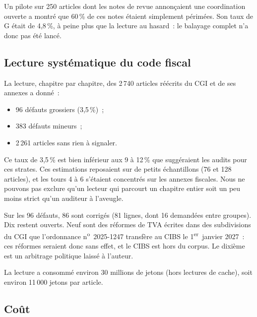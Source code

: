 \documentclass[11pt,a4paper]{article}
\begin{document}
Un pilote sur 250 articles dont les notes de revue annonçaient une coordination ouverte a montré que 60\,\% de ces notes étaient simplement périmées. Son taux de G était de 4,8\,\%, à peine plus que la lecture au hasard~: le balayage complet n'a donc pas été lancé.

\subsection{Lecture systématique du code fiscal}

La lecture, chapitre par chapitre, des 2\,740 articles réécrits du CGI et de ses annexes a donné~:
\begin{itemize}
  \item 96 défauts grossiers (3,5\,\%)~;
  \item 383 défauts mineurs~;
  \item 2\,261 articles sans rien à signaler.
\end{itemize}
Ce taux de 3,5\,\% est bien inférieur aux 9 à 12\,\% que suggéraient les audits pour ces strates. Ces estimations reposaient sur de petits échantillons (76 et 128 articles), et les tours 4 à 6 s'étaient concentrés sur les annexes fiscales. Nous ne pouvons pas exclure qu'un lecteur qui parcourt un chapitre entier soit un peu moins strict qu'un auditeur à l'aveugle.

Sur les 96 défauts, 86 sont corrigés (81 lignes, dont 16 demandées entre groupes). Dix restent ouverts. Neuf sont des réformes de TVA écrites dans des subdivisions du CGI que l'ordonnance n\textsuperscript{o}~2025-1247 transfère au CIBS le 1\textsuperscript{er}~janvier 2027~: ces réformes seraient donc sans effet, et le CIBS est hors du corpus. Le dixième est un arbitrage politique laissé à l'auteur.

La lecture a consommé environ 30 millions de jetons (hors lectures de cache), soit environ 11\,000 jetons par article.

\subsection{Coût}
\label{fr:sec:cost}
\end{document}
